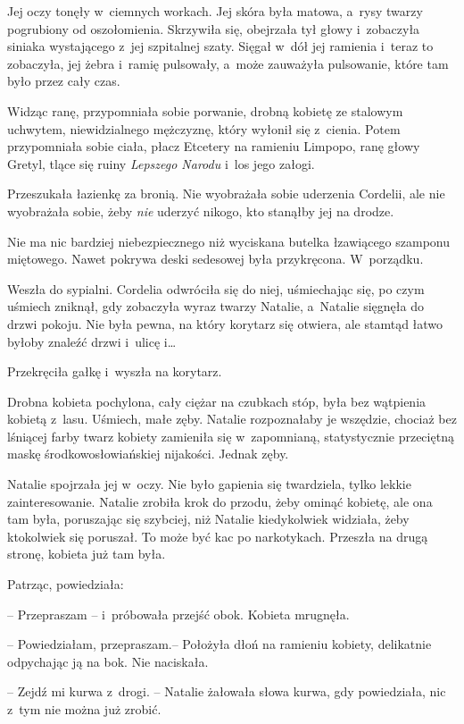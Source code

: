 \documentclass[oneside,polish,11pt,sfheadings]{mwbk}
\begin{document}
Jej oczy tonęły w~ciemnych workach. Jej skóra była matowa, a~rysy twarzy
pogrubiony od oszołomienia. Skrzywiła się, obejrzała tył głowy i~zobaczyła siniaka wystającego z~jej szpitalnej szaty. Sięgał w~dół jej
ramienia i~teraz to zobaczyła, jej żebra i~ramię pulsowały, a~może
zauważyła pulsowanie, które tam było przez cały czas.

Widząc ranę, przypomniała sobie porwanie, drobną kobietę ze stalowym
uchwytem, niewidzialnego mężczyznę, który wyłonił się z~cienia. Potem
przypomniała sobie ciała, płacz Etcetery na ramieniu Limpopo, ranę głowy
Gretyl, tlące się ruiny \textit{Lepszego Narodu} i~los jego załogi.

Przeszukała łazienkę za bronią. Nie wyobrażała sobie uderzenia Cordelii,
ale nie wyobrażała sobie, żeby \textit{nie} uderzyć nikogo, kto stanąłby
jej na drodze.

Nie ma nic bardziej niebezpiecznego niż wyciskana butelka łzawiącego
szamponu miętowego. Nawet pokrywa deski sedesowej była przykręcona. W~porządku.

Weszła do sypialni. Cordelia odwróciła się do niej, uśmiechając się, po
czym uśmiech zniknął, gdy zobaczyła wyraz twarzy Natalie, a~Natalie
sięgnęła do drzwi pokoju. Nie była pewna, na który korytarz się otwiera,
ale stamtąd łatwo byłoby znaleźć drzwi i~ulicę i\ldots 

Przekręciła gałkę i~wyszła na korytarz.

Drobna kobieta pochylona, cały ciężar na czubkach stóp, była bez
wątpienia kobietą z~lasu. Uśmiech, małe zęby. Natalie rozpoznałaby je
wszędzie, chociaż bez lśniącej farby twarz kobiety zamieniła się w~zapomnianą, statystycznie przeciętną maskę środkowo\dywiz słowiańskiej
nijakości. Jednak zęby.

Natalie spojrzała jej w~oczy. Nie było gapienia się twardziela, tylko
lekkie zainteresowanie. Natalie zrobiła krok do przodu, żeby ominąć
kobietę, ale ona tam była, poruszając się szybciej, niż Natalie
kiedykolwiek widziała, żeby ktokolwiek się poruszał. To może być kac po
narkotykach. Przeszła na drugą stronę, kobieta już tam była.

Patrząc, powiedziała: 

-- Przepraszam -- i~próbowała przejść obok. Kobieta
mrugnęła.

-- Powiedziałam, przepraszam.-- Położyła dłoń na ramieniu kobiety,
delikatnie odpychając ją na bok. Nie naciskała.

-- Zejdź mi kurwa z~drogi. -- Natalie żałowała słowa kurwa, gdy
powiedziała, nic z~tym nie można już zrobić.
\end{document}
